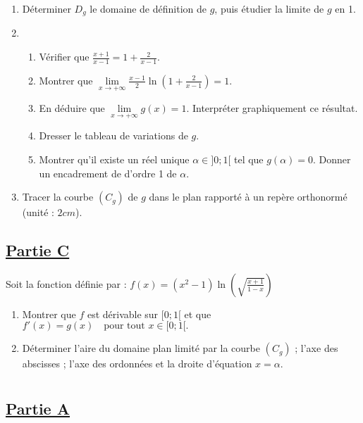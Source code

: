 \documentclass[12pt,a4paper]{article}
\begin{document}
\begin{enumerate}
    \item Déterminer \( D_g \) le domaine de définition de \( g \), puis étudier la limite de \( g \) en 1.
    \item
          \begin{enumerate}
              \item Vérifier que \( \frac{x+1}{x-1} = 1 + \frac{2}{x-1}. \)

              \item Montrer que \( \lim\limits_{x \to +\infty} \frac{x-1}{2} \ln \left( 1 + \frac{2}{x-1} \right) = 1. \)
              \item En déduire que \(         \lim\limits_{x \to +\infty} g(x) = 1. \)
                    Interpréter graphiquement ce résultat.
              \item Dresser le tableau de variations de \( g \).
              \item Montrer qu’il existe un réel unique \( \alpha \in ]0;1[ \) tel que \( g(\alpha) = 0 \). Donner un encadrement de d’ordre 1 de \( \alpha \).
          \end{enumerate}
    \item Tracer la courbe \( (C_g) \) de \( g \) dans le plan rapporté à un repère orthonormé (unité : \( 2cm \)).
\end{enumerate}

\subsection*{\underline{\textbf{Partie C}}}

Soit la fonction définie par : \( f(x) = (x^2 - 1) \ln \left( \sqrt{\frac{x+1}{1-x}} \right) \)

\begin{enumerate}
    \item Montrer que \( f \) est dérivable sur \( [0;1[ \) et que  \(     f'(x) = g(x) \quad \text{pour tout } x \in [0;1[. \)
    \item Déterminer l’aire du domaine plan limité par la courbe \( (C_g) \) ; l’axe des abscisses ; l’axe des ordonnées et la droite d’équation \( x = \alpha \).
\end{enumerate}
\section*{}

\subsection*{\underline{\textbf{Partie A}}}
\end{document}
